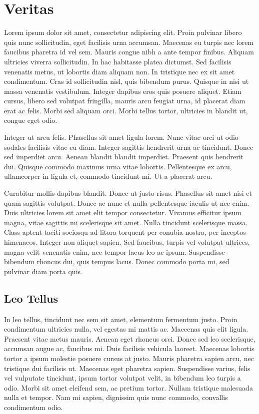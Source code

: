 \section{Veritas}

Lorem ipsum dolor sit amet, consectetur adipiscing elit. Proin pulvinar libero quis nunc sollicitudin, eget facilisis urna accumsan. Maecenas eu turpis nec lorem faucibus pharetra id vel sem. Mauris congue nibh a ante tempor finibus. Aliquam ultricies viverra sollicitudin. In hac habitasse platea dictumst. Sed facilisis venenatis metus, ut lobortis diam aliquam non. In tristique nec ex sit amet condimentum. Cras id sollicitudin nisl, quis bibendum purus. Quisque in nisi ut massa venenatis vestibulum. Integer dapibus eros quis posuere aliquet. Etiam cursus, libero sed volutpat fringilla, mauris arcu feugiat urna, id placerat diam erat ac felis. Morbi sed aliquam orci. Morbi tellus tortor, ultricies in blandit ut, congue eget odio.

Integer ut arcu felis. Phasellus sit amet ligula lorem. Nunc vitae orci ut odio sodales facilisis vitae eu diam. Integer sagittis hendrerit urna ac tincidunt. Donec sed imperdiet arcu. Aenean blandit blandit imperdiet. Praesent quis hendrerit dui. Quisque commodo maximus urna vitae lobortis. Pellentesque ex arcu, ullamcorper in ligula et, commodo tincidunt mi. Ut a placerat arcu.

Curabitur mollis dapibus blandit. Donec ut justo risus. Phasellus sit amet nisi et quam sagittis volutpat. Donec ac nunc et nulla pellentesque iaculis ut nec enim. Duis ultricies lorem sit amet elit tempor consectetur. Vivamus efficitur ipsum magna, vitae sagittis mi scelerisque sit amet. Nulla tincidunt scelerisque massa. Class aptent taciti sociosqu ad litora torquent per conubia nostra, per inceptos himenaeos. Integer non aliquet sapien. Sed faucibus, turpis vel volutpat ultrices, magna velit venenatis enim, nec tempor lacus leo ac ipsum. Suspendisse bibendum rhoncus dui, quis tempus lacus. Donec commodo porta mi, sed pulvinar diam porta quis.

\subsection{Leo Tellus}

In leo tellus, tincidunt nec sem sit amet, elementum fermentum justo. Proin condimentum ultricies nulla, vel egestas mi mattis ac. Maecenas quis elit ligula. Praesent vitae metus mauris. Aenean eget rhoncus orci. Donec sed leo scelerisque, accumsan augue ac, faucibus mi. Duis facilisis vehicula laoreet. Maecenas lobortis tortor a ipsum molestie posuere cursus at justo. Mauris pharetra sapien arcu, nec tristique dui facilisis ut. Maecenas eget pharetra sapien. Suspendisse varius, felis vel vulputate tincidunt, ipsum tortor volutpat velit, in bibendum leo turpis a odio. Morbi sit amet eleifend sem, ac pretium tortor. Nullam tristique malesuada nulla et tempor. Nam mi sapien, dignissim quis nunc commodo, convallis condimentum odio.

